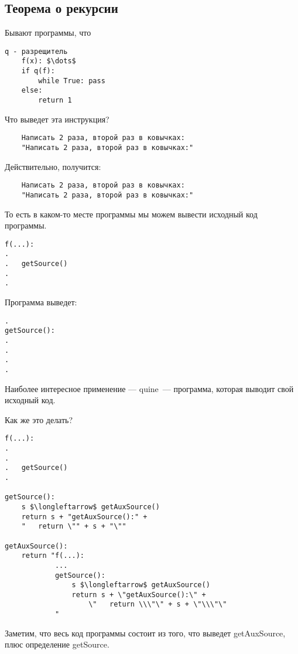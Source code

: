 \subsection{Теорема о рекурсии}

Бывают программы, что
\begin{lstlisting}[mathescape=true]
q - разрещитель
    f(x): $\dots$
    if q(f):
        while True: pass
    else:
        return 1
\end{lstlisting}

\begin{example}[игрушечный] Что выведет эта инструкция?
\begin{verbatim}
    Написать 2 раза, второй раз в ковычках:
    "Написать 2 раза, второй раз в ковычках:"
\end{verbatim}

Действительно, получится:
\begin{verbatim}
    Написать 2 раза, второй раз в ковычках:
    "Написать 2 раза, второй раз в ковычках:"
\end{verbatim}
\end{example}

То есть в каком-то месте программы мы можем вывести исходный код программы.

\begin{lstlisting}[mathescape=true]
f(...):
.
.   getSource()
.
.
\end{lstlisting}
Программа выведет:
\begin{verbatim}
.
getSource():
.
.
.
.
\end{verbatim}

Наиболее интересное применение --- quine~--- программа, которая выводит свой исходный код.

Как же это делать?
\begin{lstlisting}[mathescape=true]
f(...):
.
.
.   getSource()
.

getSource():
    s $\longleftarrow$ getAuxSource()
    return s + "getAuxSource():" +
    "   return \"" + s + "\""

getAuxSource():
    return "f(...):
            ...
            getSource():
                s $\longleftarrow$ getAuxSource()
                return s + \"getAuxSource():\" +
                    \"   return \\\"\" + s + \"\\\"\"
            "
\end{lstlisting}
\begin{note}
Заметим, что весь код программы состоит из того, что выведет getAuxSource, плюс определение getSource.
\end{note}


